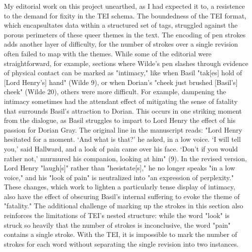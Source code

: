 \documentclass[11pt]{article}
\begin{document}
My editorial work on this project unearthed, as I had expected it to,
a resistence to the demand for fixity in the TEI schema. The
boundedness of the TEI format, which encapsultates data within a
structured set of tags, struggled against the porous perimeters of
these queer themes in the text. The encoding of pen strokes adds
another layer of difficulty, for the number of strokes over a single
revision often failed to map with the themes. While some of the
editorial were straightforward, for example, sections where Wilde's
pen slashes through evidence of physical contact can be marked as
"intimacy," like when Basil "tak[es] hold of [Lord Henry's] hand"
(Wilde 9), or when Dorian's "cheek just brushed [Basil's] cheek"
(Wilde 20), others were more difficult. For example, dampening the
intimacy sometimes had the attendant effect of mitigating the sense of
fatality that surrounds Basil's attraction to Dorian. This occurs in
one striking moment from the dialogue, as Basil struggles to impart to
Lord Henry the effect of his passion for Dorian Gray. The original
line in the manuscript reads: "Lord Henry hesitated for a moment. ‘And
what is that?' he asked, in a low voice. ‘I will tell you,' said
Hallward, and a look of pain came over his face. ‘Don't if you would
rather not,' murmured his companion, looking at him" (9). In the
revised version, Lord Henry "laugh[s]" rather than "hesistate[s]," he
no longer speaks "in a low voice," and his "look of pain" is
neutralized into "an expression of perplexity." These changes, which
work to lighten a particularly tense display of intimacy, also have
the effect of obscuring Basil's internal suffering to evoke the theme
of "fatality." The additional challenge of marking up the strokes in
this section also reinforces the limitations of TEI's nested
structure: while the word "look" is struck so heavily that the number
of strokes is inconclusive, the word "pain" contains a single
stroke. With the TEI, it is impossible to mark the number of strokes
for each word without separating the single revision into two
instances.
\end{document}
